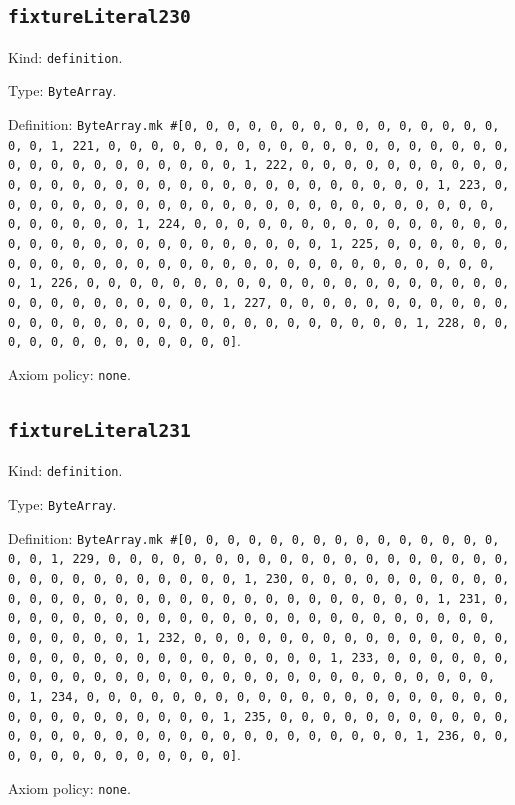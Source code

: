 \documentclass[11pt]{article}
\begin{document}
\subsection*{\texttt{fixtureLiteral230}}
\noindent Kind: \texttt{definition}.\par
\noindent Type: \texttt{ByteArray}.\par
\noindent Definition: \texttt{ByteArray.mk \#[0, 0, 0, 0, 0, 0, 0, 0, 0, 0, 0, 0, 0, 0, 0, 0, 0, 1, 221, 0, 0, 0, 0, 0, 0, 0, 0, 0, 0, 0, 0, 0, 0, 0, 0, 0, 0, 0, 0, 0, 0, 0, 0, 0, 0, 0, 0, 0, 0, 1, 222, 0, 0, 0, 0, 0, 0, 0, 0, 0, 0, 0, 0, 0, 0, 0, 0, 0, 0, 0, 0, 0, 0, 0, 0, 0, 0, 0, 0, 0, 0, 1, 223, 0, 0, 0, 0, 0, 0, 0, 0, 0, 0, 0, 0, 0, 0, 0, 0, 0, 0, 0, 0, 0, 0, 0, 0, 0, 0, 0, 0, 0, 0, 1, 224, 0, 0, 0, 0, 0, 0, 0, 0, 0, 0, 0, 0, 0, 0, 0, 0, 0, 0, 0, 0, 0, 0, 0, 0, 0, 0, 0, 0, 0, 0, 1, 225, 0, 0, 0, 0, 0, 0, 0, 0, 0, 0, 0, 0, 0, 0, 0, 0, 0, 0, 0, 0, 0, 0, 0, 0, 0, 0, 0, 0, 0, 0, 1, 226, 0, 0, 0, 0, 0, 0, 0, 0, 0, 0, 0, 0, 0, 0, 0, 0, 0, 0, 0, 0, 0, 0, 0, 0, 0, 0, 0, 0, 0, 0, 1, 227, 0, 0, 0, 0, 0, 0, 0, 0, 0, 0, 0, 0, 0, 0, 0, 0, 0, 0, 0, 0, 0, 0, 0, 0, 0, 0, 0, 0, 0, 0, 1, 228, 0, 0, 0, 0, 0, 0, 0, 0, 0, 0, 0, 0, 0]}.\par
\noindent Axiom policy: \texttt{none}.\par
\subsection*{\texttt{fixtureLiteral231}}
\noindent Kind: \texttt{definition}.\par
\noindent Type: \texttt{ByteArray}.\par
\noindent Definition: \texttt{ByteArray.mk \#[0, 0, 0, 0, 0, 0, 0, 0, 0, 0, 0, 0, 0, 0, 0, 0, 0, 1, 229, 0, 0, 0, 0, 0, 0, 0, 0, 0, 0, 0, 0, 0, 0, 0, 0, 0, 0, 0, 0, 0, 0, 0, 0, 0, 0, 0, 0, 0, 0, 1, 230, 0, 0, 0, 0, 0, 0, 0, 0, 0, 0, 0, 0, 0, 0, 0, 0, 0, 0, 0, 0, 0, 0, 0, 0, 0, 0, 0, 0, 0, 0, 1, 231, 0, 0, 0, 0, 0, 0, 0, 0, 0, 0, 0, 0, 0, 0, 0, 0, 0, 0, 0, 0, 0, 0, 0, 0, 0, 0, 0, 0, 0, 0, 1, 232, 0, 0, 0, 0, 0, 0, 0, 0, 0, 0, 0, 0, 0, 0, 0, 0, 0, 0, 0, 0, 0, 0, 0, 0, 0, 0, 0, 0, 0, 0, 1, 233, 0, 0, 0, 0, 0, 0, 0, 0, 0, 0, 0, 0, 0, 0, 0, 0, 0, 0, 0, 0, 0, 0, 0, 0, 0, 0, 0, 0, 0, 0, 1, 234, 0, 0, 0, 0, 0, 0, 0, 0, 0, 0, 0, 0, 0, 0, 0, 0, 0, 0, 0, 0, 0, 0, 0, 0, 0, 0, 0, 0, 0, 0, 1, 235, 0, 0, 0, 0, 0, 0, 0, 0, 0, 0, 0, 0, 0, 0, 0, 0, 0, 0, 0, 0, 0, 0, 0, 0, 0, 0, 0, 0, 0, 0, 1, 236, 0, 0, 0, 0, 0, 0, 0, 0, 0, 0, 0, 0, 0]}.\par
\noindent Axiom policy: \texttt{none}.\par
\end{document}
